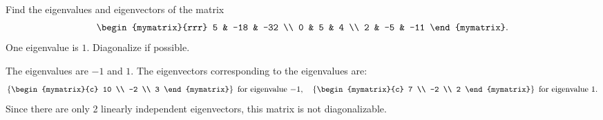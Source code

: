 \begin{ex}
  Find the eigenvalues and eigenvectors of the matrix
  \begin{equation*}
    \begin{mymatrix}{rrr}
      5 & -18 & -32 \\
      0 & 5 & 4 \\
      2 & -5 & -11
    \end{mymatrix}.
  \end{equation*}
  One eigenvalue is $1$. Diagonalize if possible.
  \begin{sol}
    The eigenvalues are $-1$ and $1$. The eigenvectors corresponding to
    the eigenvalues are:
    \begin{equation*}
      \set{\begin{mymatrix}{c}
          10 \\
          -2 \\
          3
        \end{mymatrix}} ~\mbox{for eigenvalue}~ {-1},
      \quad
      \set{\begin{mymatrix}{c}
          7 \\
          -2 \\
          2
        \end{mymatrix}} ~\mbox{for eigenvalue}~ {1}.
    \end{equation*}
    Since there are only 2 linearly independent eigenvectors, this
    matrix is not diagonalizable.
  \end{sol}
\end{ex}

